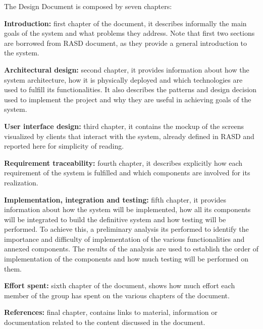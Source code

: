The Design Document is composed by seven chapters:

\textbf{Introduction:} first chapter of the document, it describes informally the main goals of the system and what problems they address. Note that first two sections are borrowed from RASD document, as they provide a general introduction to the system.

\textbf{Architectural design:} second chapter, it provides information about how the system architecture, how it is physically deployed and which technologies are used to fulfill its functionalities. It also describes the patterns and design decision used to implement the project and why they are useful in achieving goals of the system.

\textbf{User interface design:} third chapter, it contains the mockup of the screens visualized by clients that interact with the system, already defined in RASD and reported here for simplicity of reading.

\textbf{Requirement traceability:} fourth chapter, it describes explicitly how each requirement of the system is fulfilled and which components are involved for its realization.

\textbf{Implementation, integration and testing:} fifth chapter, it provides information about how the system will be implemented, how all its components will be integrated to build the definitive system and how testing will be performed. To achieve this, a preliminary analysis its performed to identify the importance and difficulty of implementation of the various functionalities and annexed components. The results of the analysis are used to establish the order of implementation of the components and how much testing will be performed on them.

\textbf{Effort spent:} sixth chapter of the document, shows how much effort each member of the group has spent on the various chapters of the document.

\textbf{References:} final chapter, contains links to material, information or documentation related to the content discussed in the document.


